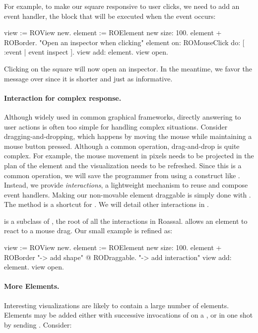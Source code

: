 \documentclass[a4paper,10pt,twoside]{book}
\begin{document}
For example, to make our square responsive to user clicks, we need to add an event handler, \ie the block that will be executed when the event occurs:

\begin{code}{}
view := ROView new.
element := ROElement new size: 100.
element + ROBorder. 
"Open an inspector when clicking"
element on: ROMouseClick do: [ :event | event inspect ]. 
view add: element.
view open.
\end{code}

Clicking on the square will now open an inspector. In the meantime, we favor the message \ct{+} over  since it is shorter and just as informative.

\paragraph{Interaction for complex response.}
Although widely used in common graphical frameworks, directly answering to user actions is often too simple for handling complex situations. Consider dragging-and-dropping, which happens by moving the mouse while maintaining a mouse button pressed. Although a common operation, drag-and-drop is quite complex. For example, the mouse movement in pixels needs to be projected in the plan of the element and the visualization needs to be refreshed. Since this is a common operation, we will save the programmer from using a construct like . Instead, we provide \emph{interactions}, a lightweight mechanism to reuse and compose event handlers. Making our non-movable element draggable is simply done with . The  method is a shortcut for . We will detail other interactions in .

 is a subclass of , the root of all the interactions in Roassal.  allows an element to react to a mouse drag. Our small example is refined as:

\begin{code}{}
view := ROView new.
element := ROElement new size: 100.
element 
	+ ROBorder "-> add shape"
	@ RODraggable. "-> add interaction"
view add: element.
view open.
\end{code}


\paragraph{More Elements.}
Interesting visualizations are likely to contain a large number of elements. Elements may be added either with successive invocations of  on a , or in one shot by sending . Consider:
\end{document}

